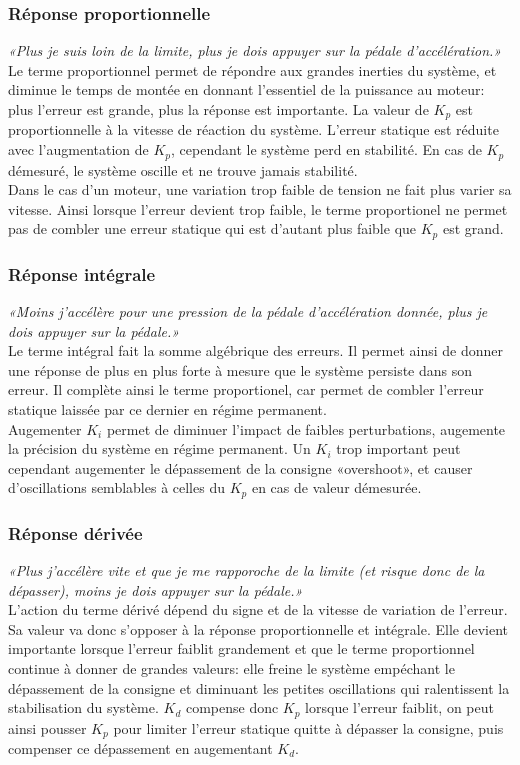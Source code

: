             \subsubsection{Réponse proportionnelle}
                \textit{«Plus je suis loin de la limite, plus je dois appuyer sur la pédale d'accélération.»}\\
                Le terme proportionnel permet de répondre aux grandes inerties du système, et diminue le temps de montée en donnant l'essentiel de la puissance au moteur: plus l'erreur est grande, plus la réponse est importante. La valeur de $K_p$ est proportionnelle à la vitesse de réaction du système. L'erreur statique est réduite avec l'augmentation de $K_p$, cependant le système perd en stabilité. En cas de $K_p$ démesuré, le système oscille et ne trouve jamais stabilité.\\
                Dans le cas d'un moteur, une variation trop faible de tension ne fait plus varier sa vitesse. Ainsi lorsque l'erreur devient trop faible, le terme proportionel ne permet pas de combler une erreur statique qui est d'autant plus faible que $K_p$ est grand.

            \subsubsection{Réponse intégrale}
                \textit{«Moins j'accélère pour une pression de la pédale d'accélération donnée, plus je dois appuyer sur la pédale.»}\\
                Le terme intégral fait la somme algébrique des erreurs. Il permet ainsi de donner une réponse de plus en plus forte à mesure que le système persiste dans son erreur. Il complète ainsi le terme proportionel, car permet de combler l'erreur statique laissée par ce dernier en régime permanent.\\
                Augementer $K_i$ permet de diminuer l'impact de faibles perturbations, augemente la précision du système en régime permanent. Un $K_i$ trop important peut cependant augementer le dépassement de la consigne «overshoot», et causer d'oscillations semblables à celles du $K_p$ en cas de valeur démesurée.

            \subsubsection{Réponse dérivée}
                \textit{«Plus j'accélère vite et que je me rapporoche de la limite (et risque donc de la dépasser), moins je dois appuyer sur la pédale.»}\\
                L'action du terme dérivé dépend du signe et de la vitesse de variation de l'erreur. Sa valeur va donc s'opposer à la réponse proportionnelle et intégrale. Elle devient importante lorsque l'erreur faiblit grandement et que le terme proportionnel continue à donner de grandes valeurs: elle freine le système empéchant le dépassement de la consigne et diminuant les petites oscillations qui ralentissent la stabilisation du système. $K_d$ compense donc $K_p$ lorsque l'erreur faiblit, on peut ainsi pousser $K_p$ pour limiter l'erreur statique quitte à dépasser la consigne, puis compenser ce dépassement en augementant $K_d$.

